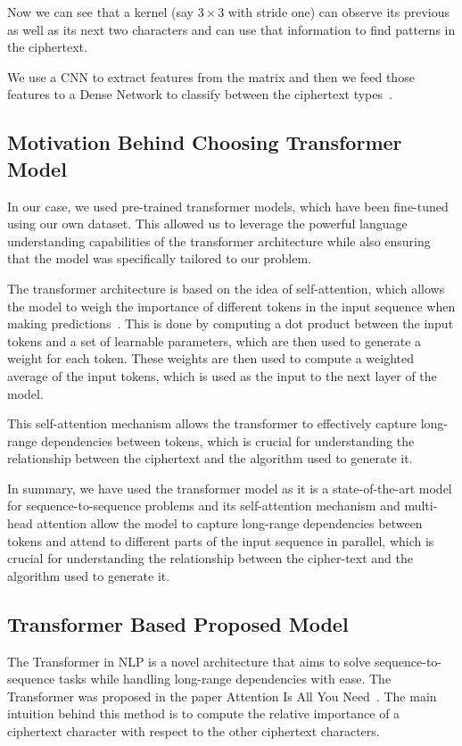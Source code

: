 \documentclass[runningheads]{llncs}
\begin{document}
Now we can see that a kernel (say $3 \times 3$ with stride one) 
can observe its previous as well as its next two characters and can 
use that information to find patterns in the ciphertext.

We use a CNN to extract features from the matrix and then we 
feed those features to a Dense Network to classify between the 
ciphertext types~\cite{DBLP:journals/corr/OSheaN15}.

\subsection{Motivation Behind Choosing Transformer Model}  

In our case, we used pre-trained transformer models, which have been fine-tuned using our own dataset. This allowed us to leverage the powerful language understanding capabilities of the transformer architecture while also ensuring that the model was specifically tailored to our problem.

The transformer architecture is based on the idea of self-attention, which allows the model to weigh the importance of different tokens in the input sequence when making predictions~\cite{vaswani2017attention}. This is done by computing a dot product between the input tokens and a set of learnable parameters, which are then used to generate a weight for each token. These weights are then used to compute a weighted average of the input tokens, which is used as the input to the next layer of the model.

This self-attention mechanism allows the transformer to effectively capture long-range dependencies between tokens, which is crucial for understanding the relationship between the ciphertext and the algorithm used to generate it. 

In summary, we have used the transformer model as it is a state-of-the-art model for sequence-to-sequence problems and its self-attention mechanism and multi-head attention allow the model to capture long-range dependencies between tokens and attend to different parts of the input sequence in parallel, which is crucial for understanding the relationship between the cipher-text and the algorithm used to generate it. 

\subsection{Transformer Based Proposed Model}  

The Transformer in NLP is a novel architecture that aims to 
solve sequence-to-sequence tasks while handling long-range dependencies 
with ease. The Transformer was proposed in the paper Attention 
Is All You Need~\cite{vaswani2017attention}. The main intuition behind this method is to compute the relative 
importance of a ciphertext character with respect to the other 
ciphertext characters. 
\end{document}
